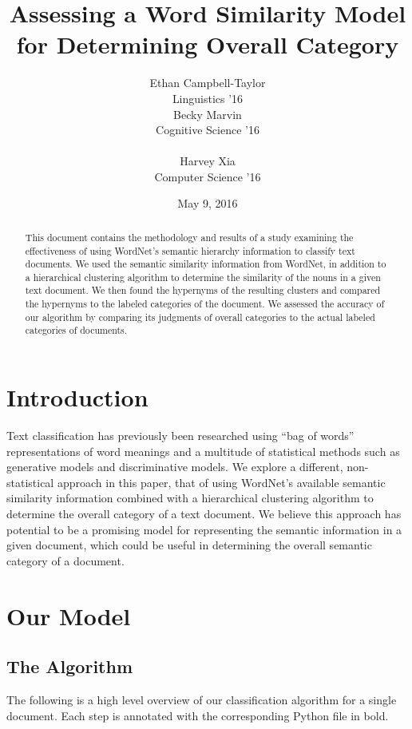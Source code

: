 \documentclass[11pt]{article}
\title{Assessing a Word Similarity Model for Determining Overall Category}
\author{Ethan Campbell-Taylor \\
Linguistics '16\\\And
  Becky Marvin \\
  Cognitive Science '16 \\
  \\\And
  Harvey Xia \\
  Computer Science '16 \\}
\date{May 9, 2016}
\begin{document}
\maketitle
\begin{abstract}
  This document contains the methodology and results of a study examining the effectiveness of using WordNet's semantic hierarchy information to classify text documents. We used the semantic similarity information from WordNet, in addition to a hierarchical clustering algorithm to determine the similarity of the nouns in a given text document. We then found the hypernyms of the resulting clusters and compared the hypernyms to the labeled categories of the document. We assessed the accuracy of our algorithm by comparing its judgments of overall categories to the actual labeled categories of documents.
\end{abstract}

\section{Introduction}

Text classification has previously been researched using ``bag of words'' representations of word meanings and a multitude of statistical methods such as generative models and discriminative models. We explore a different, non-statistical approach in this paper, that of using WordNet's available semantic similarity information combined with a hierarchical clustering algorithm to determine the overall category of a text document. We believe this approach has potential to be a promising model for representing the semantic information in a given document, which could be useful in determining the overall semantic category of a document.

\section{Our Model}

\subsection{The Algorithm}

The following is a high level overview of our classification algorithm for a single document. Each step is annotated with the corresponding Python file in bold.
\end{document}
